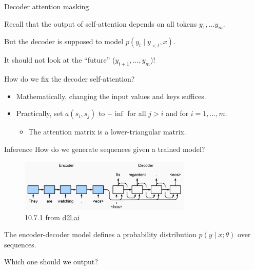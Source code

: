 \documentclass[usenames,dvipsnames,notes,11pt,aspectratio=169,hyperref={colorlinks=true, linkcolor=blue}]{beamer}
\begin{document}
\begin{frame}
    {Decoder attention masking}

    Recall that the output of self-attention depends on all tokens $y_1,\ldots y_m$.

    But the decoder is supposed to model $p(y_t\mid y_{<t}, x)$.

    It should not look at the ``future'' ($y_{t+1},\ldots,y_m$)!

    \pause
    How do we fix the decoder self-attention?\\
    \begin{itemize}
        \item Mathematically, changing the input values and keys suffices.
        \item Practically, set $a(s_i, s_j)$ to $-\inf$ for all $j>i$ and for $i=1,\ldots,m$.
            \begin{itemize}
                \item The attention matrix is a lower-triangular matrix.
            \end{itemize}
    \end{itemize}
\end{frame}


\begin{frame}
    {Inference}
    How do we generate sequences given a trained model?
    \begin{figure}
        \includegraphics[height=2.5cm]{figures/rnn-enc-dec-gen}
        \caption{10.7.1 from \href{https://d2l.ai/chapter_recurrent-modern/seq2seq.html}{d2l.ai}}
    \end{figure}

    The encoder-decoder model defines a probability distribution $p(y\mid x;\theta)$ over sequences.

    Which one should we output?
\end{frame}
\end{document}
